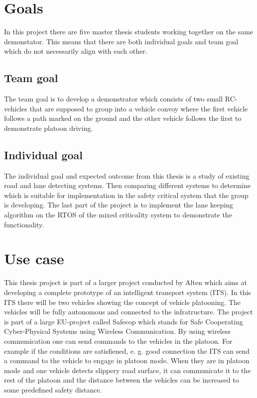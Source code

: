 \section{Goals}
In this project there are five master thesis students working together on the same demonstator. This means that there are both individual goals and team goal which do not necessarily align with each other.

\subsection{Team goal}
The team goal is to develop a demonstrator which consists of two small RC-vehicles that are supposed to group into a vehicle convoy where the first vehicle follows a path marked on the ground and the other vehicle follows the first to demonstrate platoon driving.

\subsection{Individual goal}
The individual goal and expected outcome from this thesis is a study of existing road and lane detecting systems. Then comparing different systems to determine which is suitable for implementation in the safety critical system that the group is developing. The last part of the project is to implement the lane keeping algorithm on the RTOS of the mixed criticality system to demonstrate the functionality.

\section{Use case}
This thesis project is part of a larger project conducted by Alten which aims at developing a complete prototype of an intelligent transport system (ITS). In this ITS there will be two vehicles showing the concept of vehicle platooning. The vehicles will be fully autonomous and connected to the infratructure. The project is part of a large EU-project called Safecop which stands for Safe Cooperating Cyber-Physical Systems using Wireless Communication. By using wireless communication one can send commands to the vehicles in the platoon. For example if the conditions are satisfiened, e. g. good connection the ITS can send a command to the vehicle to engage in platoon mode. When they are in platoon mode and one vehicle detects slippery road surface, it can communicate it to the rest of the platoon and the distance between the vehicles can be increased to some predefined safety distance.\\

